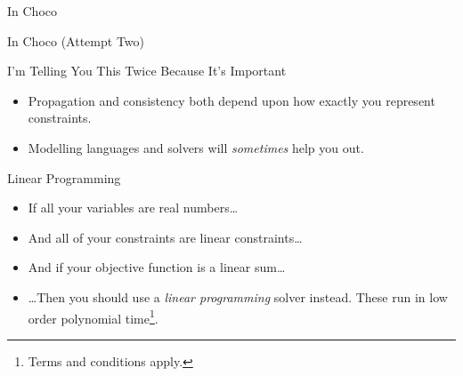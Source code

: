 \documentclass{beamer}
\begin{document}
\begin{frame}[fragile]{In Choco}
     {
        
    }
     {
        
    }
\end{frame}

\begin{frame}{In Choco (Attempt Two)}
     {
        
    }
     {
        \begin{minipage}{0.47\paperwidth}
        \end{minipage}\begin{minipage}{0.44\paperwidth}
        \end{minipage}
    }
\end{frame}

\begin{frame}{I'm Telling You This Twice Because It's Important}
    \begin{itemize}
        \item Propagation and consistency both depend upon how exactly you represent constraints.
        \item Modelling languages and solvers will \emph{sometimes} help you out.
    \end{itemize}
\end{frame}

\begin{frame}{Linear Programming}
    \begin{itemize}
        \item If all your variables are real numbers\ldots
        \item And all of your constraints are linear constraints\ldots
        \item And if your objective function is a linear sum\ldots
        \item \ldots Then you should use a \emph{linear programming} solver instead. These run in
            low order polynomial time\footnote{Terms and conditions apply.}.
    \end{itemize}
\end{frame}
\end{document}
